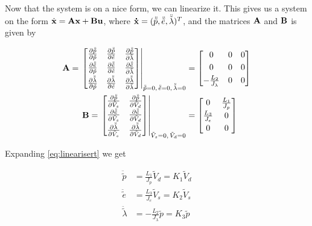 Now that the system is on a nice form, we can linearize it. This gives us a system on the form $ \dot{\mathbf{x}} = \mathbf{A} \mathbf{x} + \mathbf{B} \mathbf{u} $, where $\mathbf{\dot x} = (\ddot{\tilde p}, \ddot{\tilde e}, \ddot{\tilde \lambda})^T$, and the matrices $\mathbf{A}$ and $\mathbf{B}$ is given by
	
\begin{subequations}
	\begin{align}
		\mathbf{A} =\left. \begin{bmatrix}
			\frac{\partial{\ddot{\tilde{p}}}}{\partial{\tilde p}} & \frac{\partial{\ddot{\tilde p}}}{\partial{\tilde e}} & \frac{\partial{\ddot{\tilde p}}}{\partial{\tilde \lambda}}\\[0.3em]
			\frac{\partial{\ddot{\tilde{e}}}}{\partial{\tilde p}} & \frac{\partial{\ddot{\tilde{e}}}}{\partial{\tilde e}} & \frac{\partial{\ddot{\tilde{e}}}}{\partial{\tilde \lambda}}\\[0.3em]
			\frac{\partial{\ddot{\tilde \lambda}}}{\partial{\tilde p}} & \frac{\partial{\ddot{\tilde \lambda}}}{\partial{\tilde e}} & \frac{\partial{\ddot{\tilde \lambda}}}{\partial{\tilde \lambda}}
		\end{bmatrix} \right|_{\ddot{\tilde p} = 0 ,\, \ddot{\tilde e} = 0,\, \ddot{\tilde \lambda} = 0 } &= 
		\begin{bmatrix}
			0 & 0 & 0\\[0.3em]
			0 & 0 & 0\\[0.3em]
			-\frac{L_2}{J_\lambda} & 0 & 0
		\end{bmatrix}\\
		\mathbf{B} = \left. \begin{bmatrix}
			\frac{\partial{\ddot{\tilde p}}}{\partial{\tilde V_s}} & \frac{\partial{\ddot{\tilde p}}}{\partial{\tilde V_d}}\\[0.3em]
			\frac{\partial{\ddot{\tilde e}}}{\partial{\tilde V_s}} & \frac{\partial{\ddot{\tilde e}}}{\partial{\tilde V_d}}\\[0.3em]
			\frac{\partial{\ddot{\tilde \lambda}}}{\partial{\tilde V_s}} & \frac{\partial{\ddot{\tilde \lambda}}}{\partial{\tilde V_d}}
		\end{bmatrix} \right|_{\tilde V_s = 0,\, \tilde V_d = 0} &= 
		\begin{bmatrix}
			0 & \frac{L_1}{J_p}\\[0.3em]
			\frac{L_3}{J_e} & 0\\[0.3em]
			0 & 0
		\end{bmatrix}
	\end{align}
	\label{eq:linearisert}
\end{subequations}

Expanding \cref{eq:linearisert} we get

\begin{subequations}
	\begin{align}
		\ddot{\tilde p} &= \frac{L_1}{J_p} \tilde V_d = K_1 \tilde V_d\\
		\ddot{\tilde e} &= \frac{L_3}{J_e} \tilde V_s = K_2 \tilde V_s\\
		\ddot{\tilde \lambda} &= -\frac{L_2}{J_{\lambda}} \tilde p = K_3 \tilde p \label{eq:linddotlambda}
	\end{align}
\end{subequations}

